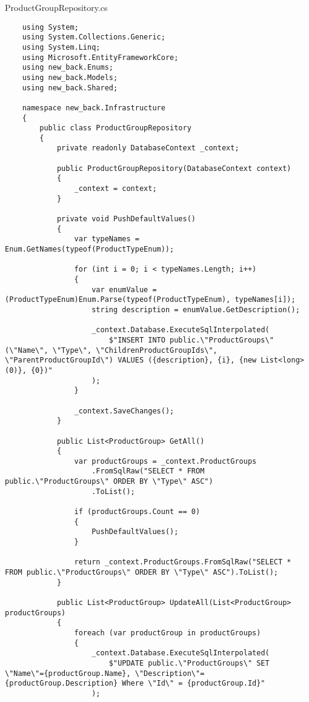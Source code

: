 ProductGroupRepository.cs
\lstset{style=sharpc}
\begin{lstlisting}
    using System;
    using System.Collections.Generic;
    using System.Linq;
    using Microsoft.EntityFrameworkCore;
    using new_back.Enums;
    using new_back.Models;
    using new_back.Shared;
    
    namespace new_back.Infrastructure
    {
        public class ProductGroupRepository
        {
            private readonly DatabaseContext _context;
            
            public ProductGroupRepository(DatabaseContext context)
            {
                _context = context;
            }
    
            private void PushDefaultValues()
            {
                var typeNames = Enum.GetNames(typeof(ProductTypeEnum));
    
                for (int i = 0; i < typeNames.Length; i++)
                {
                    var enumValue = (ProductTypeEnum)Enum.Parse(typeof(ProductTypeEnum), typeNames[i]);
                    string description = enumValue.GetDescription();
    
                    _context.Database.ExecuteSqlInterpolated(
                        $"INSERT INTO public.\"ProductGroups\"(\"Name\", \"Type\", \"ChildrenProductGroupIds\", \"ParentProductGroupId\") VALUES ({description}, {i}, {new List<long>(0)}, {0})"
                    );
                }
                
                _context.SaveChanges();
            }
            
            public List<ProductGroup> GetAll()
            {
                var productGroups = _context.ProductGroups
                    .FromSqlRaw("SELECT * FROM public.\"ProductGroups\" ORDER BY \"Type\" ASC")
                    .ToList();
    
                if (productGroups.Count == 0)
                {
                    PushDefaultValues();
                }
                
                return _context.ProductGroups.FromSqlRaw("SELECT * FROM public.\"ProductGroups\" ORDER BY \"Type\" ASC").ToList();
            }
            
            public List<ProductGroup> UpdateAll(List<ProductGroup> productGroups)
            {
                foreach (var productGroup in productGroups)
                {
                    _context.Database.ExecuteSqlInterpolated(
                        $"UPDATE public.\"ProductGroups\" SET \"Name\"={productGroup.Name}, \"Description\"={productGroup.Description} Where \"Id\" = {productGroup.Id}"
                    );
                    

\end{lstlisting}
